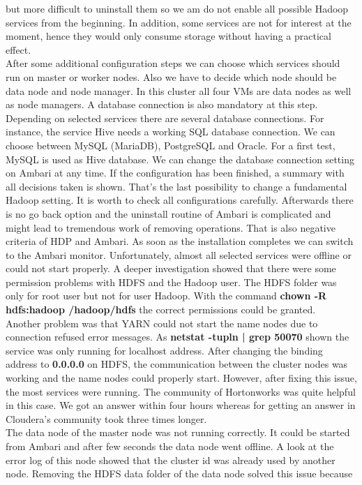 but more difficult to uninstall them so we am do not enable all possible Hadoop services from the
beginning. In addition, some services are not for interest at the moment, hence they would only consume
storage without having a practical effect.\\
After some additional configuration steps we can choose which services should run on master or worker
nodes. Also we have to decide which node should be data node and node manager. In this cluster all four VMs are data nodes as well as node managers. A database connection is also mandatory at this step. Depending on selected services there are several database connections. For instance, the
service Hive needs a working SQL database connection. We can choose between MySQL (MariaDB),
PostgreSQL and Oracle. For a first test, MySQL is used as Hive database. We can change the database
connection setting on Ambari at any time. If the configuration has been finished, a summary with all decisions taken is shown. That’s the last possibility to change a fundamental Hadoop setting. It is worth to check all configurations carefully. Afterwards there is no go back option and the uninstall routine of Ambari is complicated and might lead to tremendous work of removing operations. That is also negative criteria of HDP and Ambari. As soon as the installation completes we can switch to the Ambari monitor. Unfortunately, almost all
selected services were offline or could not start properly. A deeper investigation showed that there were
some permission problems with HDFS and the Hadoop user. The HDFS folder was only for root user but
not for user \glqq Hadoop\grqq. With the command \textbf{chown -R hdfs:hadoop /hadoop/hdfs} the correct permissions could be granted.\\
Another problem was that YARN could not start the name nodes due to connection refused error
messages. As \textbf{netstat -tupln | grep 50070} shown the service was only running for localhost address. After changing the binding address to \textbf{0.0.0.0} on HDFS, the communication between the cluster nodes was working and the name nodes could properly start. However, after fixing this issue, the most services were running. The community of Hortonworks was quite helpful in this case. We got an answer within four hours whereas for getting an answer in Cloudera’s community took three times longer.\\
The data node of the master node was not running correctly. It could be started from Ambari and after
few seconds the data node went offline. A look at the error log of this node showed that the cluster id was already used by another node. Removing the HDFS data folder of the data node solved this issue because
